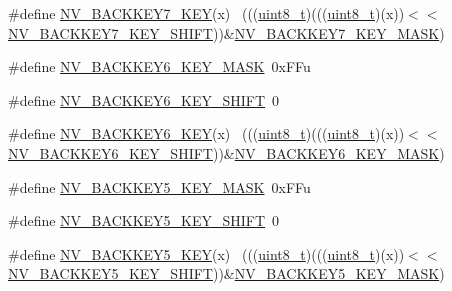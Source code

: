 \begin{DoxyCompactItemize}
\item 
\#define \hyperlink{group___n_v___register___masks_gad81b2addd996d3f0ee299e252d88b0a9}{N\+V\+\_\+\+B\+A\+C\+K\+K\+E\+Y7\+\_\+\+K\+EY}(x)                                          ~(((\hyperlink{_p_e___types_8h_aba7bc1797add20fe3efdf37ced1182c5}{uint8\+\_\+t})(((\hyperlink{_p_e___types_8h_aba7bc1797add20fe3efdf37ced1182c5}{uint8\+\_\+t})(x))$<$$<$\hyperlink{group___n_v___register___masks_gad6bef74e61e792dfa5b7d195e4ce5620}{N\+V\+\_\+\+B\+A\+C\+K\+K\+E\+Y7\+\_\+\+K\+E\+Y\+\_\+\+S\+H\+I\+FT}))\&\hyperlink{group___n_v___register___masks_gac3f2bc7dd55b7951d70a5d1fcb6552b8}{N\+V\+\_\+\+B\+A\+C\+K\+K\+E\+Y7\+\_\+\+K\+E\+Y\+\_\+\+M\+A\+SK})
\item 
\#define \hyperlink{group___n_v___register___masks_ga44e2d846ef1b9d5ad94a707fa6f29ae1}{N\+V\+\_\+\+B\+A\+C\+K\+K\+E\+Y6\+\_\+\+K\+E\+Y\+\_\+\+M\+A\+SK}~0x\+F\+Fu
\item 
\#define \hyperlink{group___n_v___register___masks_ga271a532af55987843f56d660efb5d440}{N\+V\+\_\+\+B\+A\+C\+K\+K\+E\+Y6\+\_\+\+K\+E\+Y\+\_\+\+S\+H\+I\+FT}~0
\item 
\#define \hyperlink{group___n_v___register___masks_gaf79c4e3cdf4165b1f5158054ec642039}{N\+V\+\_\+\+B\+A\+C\+K\+K\+E\+Y6\+\_\+\+K\+EY}(x)                                          ~(((\hyperlink{_p_e___types_8h_aba7bc1797add20fe3efdf37ced1182c5}{uint8\+\_\+t})(((\hyperlink{_p_e___types_8h_aba7bc1797add20fe3efdf37ced1182c5}{uint8\+\_\+t})(x))$<$$<$\hyperlink{group___n_v___register___masks_ga271a532af55987843f56d660efb5d440}{N\+V\+\_\+\+B\+A\+C\+K\+K\+E\+Y6\+\_\+\+K\+E\+Y\+\_\+\+S\+H\+I\+FT}))\&\hyperlink{group___n_v___register___masks_ga44e2d846ef1b9d5ad94a707fa6f29ae1}{N\+V\+\_\+\+B\+A\+C\+K\+K\+E\+Y6\+\_\+\+K\+E\+Y\+\_\+\+M\+A\+SK})
\item 
\#define \hyperlink{group___n_v___register___masks_gab1e58bd037f31bcaa1b96a71340315ba}{N\+V\+\_\+\+B\+A\+C\+K\+K\+E\+Y5\+\_\+\+K\+E\+Y\+\_\+\+M\+A\+SK}~0x\+F\+Fu
\item 
\#define \hyperlink{group___n_v___register___masks_ga68762e18611e6dfaed3ddfd7847c09f4}{N\+V\+\_\+\+B\+A\+C\+K\+K\+E\+Y5\+\_\+\+K\+E\+Y\+\_\+\+S\+H\+I\+FT}~0
\item 
\#define \hyperlink{group___n_v___register___masks_gafcbf4418e3079604800f92142c11c249}{N\+V\+\_\+\+B\+A\+C\+K\+K\+E\+Y5\+\_\+\+K\+EY}(x)                                          ~(((\hyperlink{_p_e___types_8h_aba7bc1797add20fe3efdf37ced1182c5}{uint8\+\_\+t})(((\hyperlink{_p_e___types_8h_aba7bc1797add20fe3efdf37ced1182c5}{uint8\+\_\+t})(x))$<$$<$\hyperlink{group___n_v___register___masks_ga68762e18611e6dfaed3ddfd7847c09f4}{N\+V\+\_\+\+B\+A\+C\+K\+K\+E\+Y5\+\_\+\+K\+E\+Y\+\_\+\+S\+H\+I\+FT}))\&\hyperlink{group___n_v___register___masks_gab1e58bd037f31bcaa1b96a71340315ba}{N\+V\+\_\+\+B\+A\+C\+K\+K\+E\+Y5\+\_\+\+K\+E\+Y\+\_\+\+M\+A\+SK})
$$
\end{DoxyCompactItemize}
